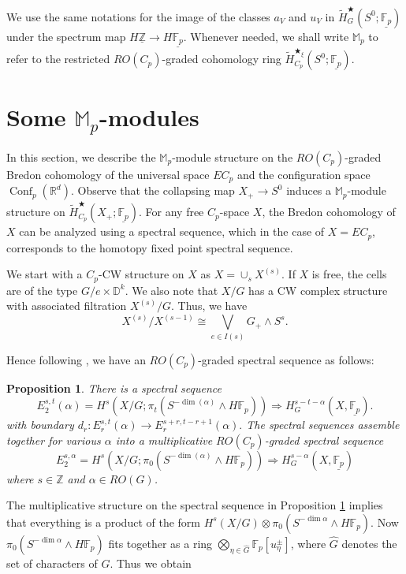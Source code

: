 \documentclass[a4paper,leqno,11pt]{amsart}
\newcommand{\bM}{\mathbb{M}}
\newcommand{\Z}{\mathbb Z}
\newcommand{\bF}{\mathbb{F}}
\newcommand{\bR}{\mathbb{R}}
\newcommand{\bFp}{\bF_p}
\newcommand{\uFp}{\underline{\bFp}}
\newcommand{\uZ}{\underline{\mathbb{Z}}}
\newcommand{\Conf}{\operatorname{Conf}}
\newcommand{\bs}{\bigstar}
\newcommand{\bsc}{\bs_\xi}
\theoremstyle{plain}
\newtheorem{prop}[theorem]{Proposition}
\theoremstyle{definition}
\theoremstyle{remark}
\begin{document}
We use the same notations for the image of the classes $a_V$ and $u_V$ in $\tilde{H}^{\bs}_G(S^0; \uFp)$ under the spectrum map $H \uZ \to H\uFp.$  Whenever needed, we shall write \( \mathbb{M}_p \) to refer to the restricted \( RO(C_p) \)-graded cohomology ring \( \tilde{H}^{\bsc}_{C_p}(S^0; \uFp) \).


\section{Some $\mathbb{M}_{p}$-modules}
In this section, we describe the $\bM_p$-module structure on the $RO(C_p)$-graded Bredon cohomology of the universal space $EC_p$ and the configuration space $\Conf_p(\bR^d)$. Observe that the collapsing map $X_+ \to S^0$ induces a $\bM_p$-module structure on $\tilde{H}^\bs_{C_p}(X_+; \uFp)$. For any free $C_p$-space $X$, the Bredon cohomology of $X$ can be analyzed using a spectral sequence, which in the case of $X = EC_p$, corresponds to the homotopy fixed point spectral sequence.

We start with a $C_p$-CW structure on $X$ as $X=\cup_s X^{(s)}$. If $X$ is free, the cells are of the type $G/e \times \mathbb{D}^k$. We also note that $X/G$ has a CW complex structure with associated filtration $X^{(s)}/G$. Thus, we have 
$$X^{(s)}/ X^{(s-1)}\cong \bigvee_{e \in I(s)}G_+ \wedge S^s.$$

Hence following \cite{BG21}, we have an $RO(C_p)$-graded spectral sequence as follows:

\begin{prop} \label{HFPSS} There is a spectral sequence 
$$E^{s,t}_2(\alpha) = H^s(X/G; {\pi}_t(S^{-\dim(\alpha)}\wedge H\bFp )) \Rightarrow H^{s-t-\alpha}_G(X, \uFp). $$
with boundary $d_r : E_r^{s,t}(\alpha) \to E_r^{s+r,t-r+1}(\alpha).$ The spectral sequences assemble together for various $\alpha$ into a multiplicative $RO(C_p)$-graded spectral sequence 
$$E^{s,\alpha}_2 = H^s(X/G; \pi_0 (S^{-\dim(\alpha)}\wedge H\bFp)) \Rightarrow  H^{s-\alpha}_G(X, \uFp)$$ 
where $s\in \Z$ and $\alpha \in RO(G)$. 
\end{prop}


The multiplicative structure on the spectral sequence in Proposition \ref{HFPSS} implies that everything is a product of the form $H^s(X/G) \otimes \pi_0 (S^{-\dim{\alpha}} \wedge H\bFp)$. Now $\pi_0 (S^{-\dim\alpha} \wedge H\bFp)$ fits together as a ring $\bigotimes\limits_{\eta \in \widehat{G}} \bFp[u_\eta^\pm]$, where $\widehat{G}$ denotes the set of characters of $G$. Thus we obtain 
\end{document}

